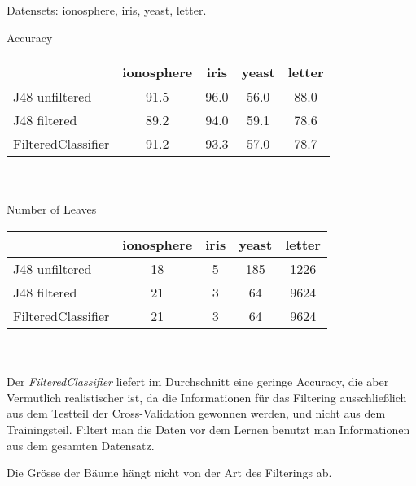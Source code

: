 Datensets: ionosphere, iris, yeast, letter.

Accuracy \\
\begin{tabular}{l|c|c|c|c}
	               & ionosphere & iris  & yeast & letter \\ \hline
J48 unfiltered     &  91.5      &  96.0 &  56.0 &  88.0  \\ \hline
J48 filtered       &  89.2      &  94.0 &  59.1 &  78.6  \\ \hline
FilteredClassifier &  91.2      &  93.3 &  57.0 &  78.7  \\ \hline
\end{tabular}\\ \\

Number of Leaves \\
\begin{tabular}{l|c|c|c|c}
	               & ionosphere & iris  & yeast & letter \\ \hline
J48 unfiltered     &  18        &  5    &  185  &  1226  \\ \hline
J48 filtered       &  21        &  3    &  64   &  9624  \\ \hline
FilteredClassifier &  21        &  3    &  64   &  9624  \\ \hline
\end{tabular}\\ \\


Der \emph{FilteredClassifier} liefert im Durchschnitt eine geringe Accuracy, die aber Vermutlich realistischer ist, da die Informationen f\"ur das Filtering ausschlie\ss lich aus dem Testteil der Cross-Validation gewonnen werden, und nicht aus dem Trainingsteil. Filtert man die Daten vor dem Lernen benutzt man Informationen aus dem gesamten Datensatz. 

Die Gr\" osse der B\"aume h\"angt nicht von der Art des Filterings ab.

